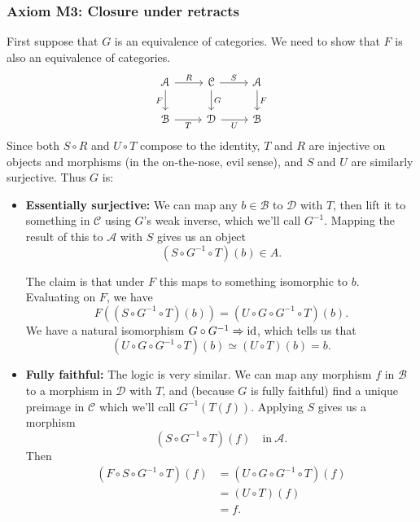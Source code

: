 \documentclass[main.tex]{subfiles}
\begin{document}
\subsubsection{Axiom M3: Closure under retracts}
First suppose that $G$ is an equivalence of categories. We need to show that $F$ is also an equivalence of categories.
\begin{equation*}
  \begin{tikzcd}
    \mathcal{A}
    \arrow[d, swap, "F"]
    \arrow[r, "R"]
    & \mathcal{C}
    \arrow[d, "G"]
    \arrow[r, "S"]
    & \mathcal{A}
    \arrow[d, "F"]
    \\
    \mathcal{B}
    \arrow[r, swap, "T"]
    & \mathcal{D}
    \arrow[r, swap, "U"]
    & \mathcal{B}
  \end{tikzcd}
\end{equation*}
Since both $S \circ R$ and $U \circ T$ compose to the identity, $T$ and $R$ are injective on objects and morphisms (in the on-the-nose, evil sense), and $S$ and $U$ are similarly surjective. Thus $G$ is:
\begin{itemize}
  \item \textbf{Essentially surjective:} We can map any $b \in \mathcal{B}$ to $\mathcal{D}$ with $T$, then lift it to something in $\mathcal{C}$ using $G$'s weak inverse, which we'll call $G ^{-1}$. Mapping the result of this to $\mathcal{A}$ with $S$ gives us an object
    \begin{equation*}
      (S \circ G^{-1} \circ T)(b) \in A.
    \end{equation*}

    The claim is that under $F$ this maps to something isomorphic to $b$. Evaluating on $F$, we have
    \begin{equation*}
      F((S \circ G^{-1} \circ T)(b)) = (U \circ G \circ G^{-1} \circ T)(b).
    \end{equation*}
    We have a natural isomorphism $G \circ G^{-1} \Rightarrow \mathrm{id}$, which tells us that
    \begin{equation*}
      (U \circ G \circ G^{-1} \circ T)(b) \simeq (U \circ T)(b) = b.
    \end{equation*}

  \item \textbf{Fully faithful:} The logic is very similar. We can map any morphism $f$ in $\mathcal{B}$ to a morphism in $\mathcal{D}$ with $T$, and (because $G$ is fully faithful) find a unique preimage in $\mathcal{C}$ which we'll call $G^{-1}(T(f))$. Applying $S$ gives us a morphism
    \begin{equation*}
      (S \circ G^{-1} \circ T)(f) \quad\text{in}\ \mathcal{A}.
    \end{equation*}
    Then
    \begin{align*}
      (F \circ S \circ G^{-1} \circ T)(f) &= (U \circ G \circ G^{-1} \circ T)(f) \\
      &= (U \circ T)(f) \\
      &= f.
    \end{align*}
\end{itemize}
\end{document}

